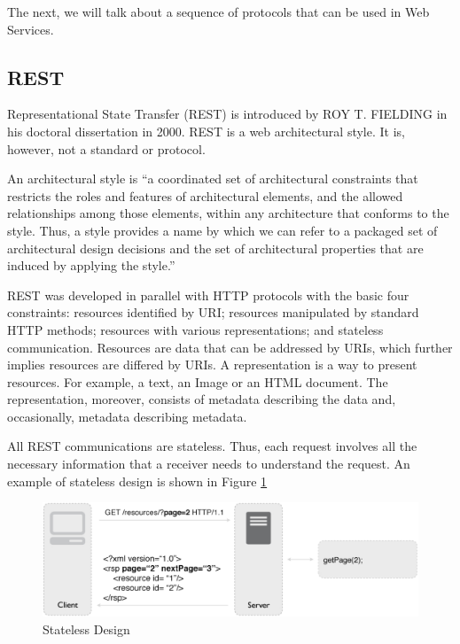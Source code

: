 The next, we will talk about a sequence of protocols that can be used in Web Services.

\subsection{REST}
Representational State Transfer (REST) is introduced by ROY T. FIELDING in his doctoral dissertation in 2000. REST is a web architectural style. It is, however, not a standard or protocol. 

An architectural style is ``a coordinated set of architectural constraints that restricts the roles and features of architectural elements, and the allowed relationships among those elements, within any architecture that conforms to the style. Thus, a style provides a name by which we can refer to a packaged set of architectural design decisions and the set of architectural properties that are induced by applying the style.'' \cite {fielding2002principled}

REST was developed in parallel with HTTP protocols with the basic four constraints: resources identified by URI; resources manipulated by standard HTTP methods; resources with various representations; and stateless communication. Resources are data that can be addressed by URIs, which further implies resources are differed by URIs. A representation is a way to present resources. For example, a text, an Image or an HTML document. The representation, moreover, consists of metadata describing the data and, occasionally, metadata describing metadata.

All REST communications are stateless. Thus, each request involves all the necessary information that a receiver needs to understand the request. An example of stateless design is shown in Figure \ref{fig:stateless-design} \cite{rodriguez2008restful}

\begin{figure}[ht]
  \begin{center}
    \includegraphics[width=1\textwidth]{images/stateless-design.pdf}
    \caption{Stateless Design}
    \label{fig:stateless-design}
  \end{center}
\end{figure}


